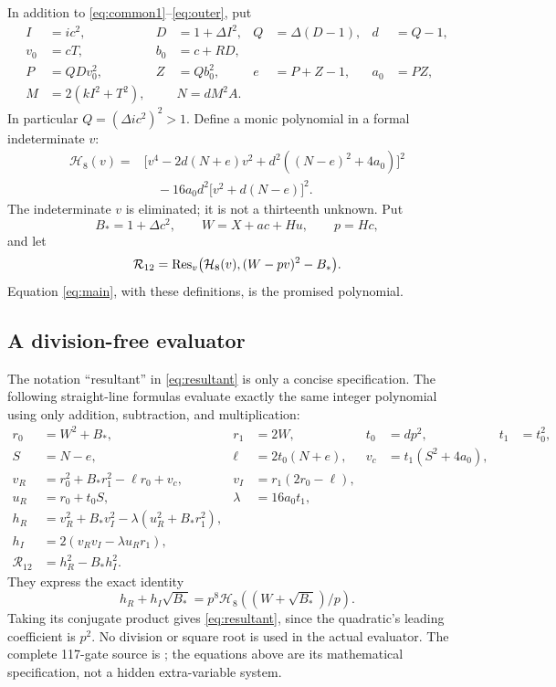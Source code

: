 \documentclass[11pt,letterpaper]{article}
\theoremstyle{remark}\newtheorem{remark}[theorem]{Remark}
\newcommand{\pathtext}[1]{\texttt{\detokenize{#1}}}
\begin{document}
In addition to \eqref{eq:common1}--\eqref{eq:outer}, put
\begin{align}
 I&=ic^2,&D&=1+\Delta I^2,&Q&=\Delta(D-1),&d&=Q-1,\nonumber\\
 v_0&=cT,&b_0&=c+RD,\nonumber\\
 P&=QD v_0^2,&Z&=Qb_0^2,&e&=P+Z-1,&a_0&=PZ,\label{eq:weighted}\\
 M&=2(kI^2+T^2),&&N=dM^2A.\nonumber
\end{align}
In particular $Q=(\Delta i c^2)^2>1$. Define a monic polynomial in a formal
indeterminate $v$:
\begin{align}
 \mathcal H_8(v)={}&
 \bigl[v^4-2d(N+e)v^2+d^2((N-e)^2+4a_0)\bigr]^2\nonumber\\
 &\quad-16a_0d^2\bigl[v^2+d(N-e)\bigr]^2.\label{eq:h8}
\end{align}
The indeterminate $v$ is eliminated; it is not a thirteenth unknown. Put
\begin{equation}\label{eq:mainquadratic}
 B_*=1+\Delta c^2,\qquad W=X+ac+Hu,\qquad p=Hc,
\end{equation}
and let
\begin{equation}\label{eq:resultant}
 \mathcal R_{12}=\operatorname{Res}_v\bigl(\mathcal H_8(v),(W-pv)^2-B_*\bigr).
\end{equation}
Equation \eqref{eq:main}, with these definitions, is the promised polynomial.

\subsection{A division-free evaluator}
The notation ``resultant'' in \eqref{eq:resultant} is only a concise
specification. The following straight-line formulas evaluate exactly the same
integer polynomial using only addition, subtraction, and multiplication:
\begin{align}
 r_0&=W^2+B_*,& r_1&=2W,& t_0&=dp^2,&t_1&=t_0^2,\nonumber\\
 S&=N-e,& \ell&=2t_0(N+e),&v_c&=t_1(S^2+4a_0),\nonumber\\
 v_R&=r_0^2+B_*r_1^2-\ell r_0+v_c,
 &v_I&=r_1(2r_0-\ell),\nonumber\\
 u_R&=r_0+t_0S,&\lambda&=16a_0t_1,\label{eq:normcircuit}\\
 h_R&=v_R^2+B_*v_I^2-\lambda(u_R^2+B_*r_1^2),\nonumber\\
 h_I&=2(v_Rv_I-\lambda u_Rr_1),\nonumber\\
 \mathcal R_{12}&=h_R^2-B_*h_I^2.\nonumber
\end{align}
They express the exact identity
\[
 h_R+h_I\sqrt{B_*}=p^8\mathcal H_8((W+\sqrt{B_*})/p).
\]
Taking its conjugate product gives \eqref{eq:resultant}, since the quadratic's
leading coefficient is $p^2$. No division or square root is used in the
actual evaluator. The complete 117-gate source is
\pathtext{data/merger12_product.json}; the equations above are its mathematical
specification, not a hidden extra-variable system.
\end{document}
